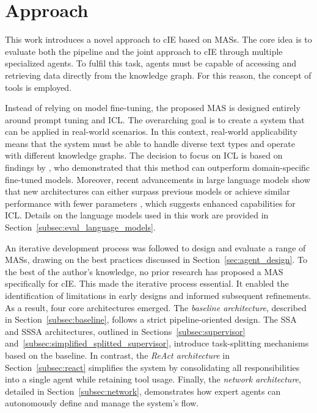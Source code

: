 \documentclass[a4paper,oneside,bibliography=totoc]{scrbook}
\begin{document}
\chapter{Approach}
\label{ch:approach}

This work introduces a novel approach to \ac{cIE} based on \acp{MAS}. The core idea is to evaluate both the pipeline and the joint approach to \ac{cIE} through multiple specialized agents. To fulfil this task, agents must be capable of accessing and retrieving data directly from the knowledge graph. For this reason, the concept of tools is employed.

Instead of relying on model fine-tuning, the proposed \ac{MAS} is designed entirely around prompt tuning and \ac{ICL}. The overarching goal is to create a system that can be applied in real-world scenarios. In this context, real-world applicability means that the system must be able to handle diverse text types and operate with different knowledge graphs. The decision to focus on \ac{ICL} is based on findings by \citet{Brown2020}, who demonstrated that this method can outperform domain-specific fine-tuned models. Moreover, recent advancements in large language models show that new architectures can either surpass previous models or achieve similar performance with fewer parameters \cite{MetaAI2025,Chiang2024}, which suggests enhanced capabilities for \ac{ICL}. Details on the language models used in this work are provided in Section~\ref{subsec:eval_language_models}.

An iterative development process was followed to design and evaluate a range of \acp{MAS}, drawing on the best practices discussed in Section~\ref{sec:agent_design}. To the best of the author's knowledge, no prior research has proposed a \ac{MAS} specifically for \ac{cIE}. This made the iterative process essential. It enabled the identification of limitations in early designs and informed subsequent refinements. As a result, four core architectures emerged. The \textit{baseline architecture}, described in Section~\ref{subsec:baseline}, follows a strict pipeline-oriented design. The \ac{SSA} and \ac{SSSA} architectures, outlined in Sections~\ref{subsec:supervisor} and~\ref{subsec:simplified_splitted_supervisor}, introduce task-splitting mechanisms based on the baseline. In contrast, the \textit{ReAct architecture} in Section~\ref{subsec:react} simplifies the system by consolidating all responsibilities into a single agent while retaining tool usage. Finally, the \textit{network architecture}, detailed in Section~\ref{subsec:network}, demonstrates how expert agents can autonomously define and manage the system's flow.
\end{document}
